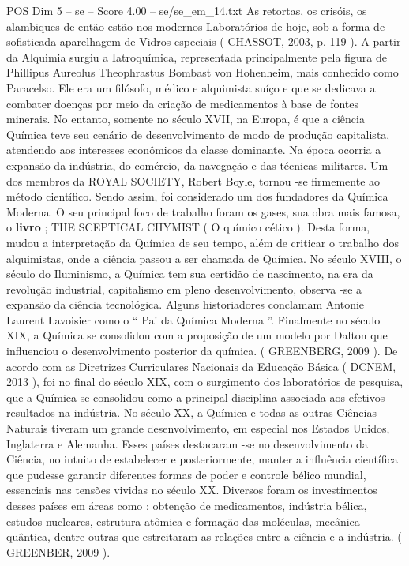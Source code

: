 \begin{textsample}{POS Dim 5 – se – Score 4.00 – se/se\_em\_14.txt}
As retortas, os crisóis, os alambiques de então estão nos modernos Laboratórios de hoje, sob a forma de sofisticada aparelhagem de Vidros especiais ( CHASSOT, 2003, p. 119 ).
A partir da Alquimia surgiu a Iatroquímica, representada principalmente pela figura de Phillipus Aureolus Theophrastus Bombast von Hohenheim, mais conhecido como Paracelso.
Ele era um filósofo, médico e alquimista suíço e que se dedicava a combater doenças por meio da criação de medicamentos à base de fontes minerais.
No entanto, somente no século XVII, na Europa, é que a ciência Química teve seu cenário de desenvolvimento de modo de produção capitalista, atendendo aos interesses econômicos da classe dominante.
Na época ocorria a expansão da indústria, do comércio, da navegação e das técnicas militares.
Um dos membros da ROYAL SOCIETY, Robert Boyle, tornou -se firmemente ao método científico.
Sendo assim, foi considerado um dos fundadores da Química Moderna.
O seu principal foco de trabalho foram os gases, sua obra mais famosa, o \textbf{livro} ; THE SCEPTICAL CHYMIST ( O químico cético ).
Desta forma, mudou a interpretação da Química de seu tempo, além de criticar o trabalho dos alquimistas, onde a ciência passou a ser chamada de Química.
No século XVIII, o século do Iluminismo, a Química tem sua certidão de nascimento, na era da revolução industrial, capitalismo em pleno desenvolvimento, observa -se a expansão da ciência tecnológica.
Alguns historiadores conclamam Antonie Laurent Lavoisier como o “ Pai da Química Moderna ”.
Finalmente no século XIX, a Química se consolidou com a proposição de um modelo por Dalton que influenciou o desenvolvimento posterior da química. ( GREENBERG, 2009 ).
De acordo com as Diretrizes Curriculares Nacionais da Educação Básica ( DCNEM, 2013 ), foi no final do século XIX, com o surgimento dos laboratórios de pesquisa, que a Química se consolidou como a principal disciplina associada aos efetivos resultados na indústria.
No século XX, a Química e todas as outras Ciências Naturais tiveram um grande desenvolvimento, em especial nos Estados Unidos, Inglaterra e Alemanha.
Esses países destacaram -se no desenvolvimento da Ciência, no intuito de estabelecer e posteriormente, manter a influência científica que pudesse garantir diferentes formas de poder e controle bélico mundial, essenciais nas tensões vividas no século XX.
Diversos foram os investimentos desses países em áreas como : obtenção de medicamentos, indústria bélica, estudos nucleares, estrutura atômica e formação das moléculas, mecânica quântica, dentre outras que estreitaram as relações entre a ciência e a indústria. ( GREENBER, 2009 ).

\end{textsample}
